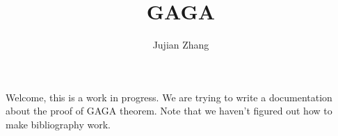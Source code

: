 \documentclass{report}
\title{GAGA}
\author{Jujian Zhang}
\begin{document}
\maketitle

Welcome, this is a work in progress. We are trying to write a documentation about the proof of GAGA theorem. Note that we haven't figured out how to make bibliography work.


\end{document}
